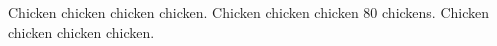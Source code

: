 Chicken chicken chicken chicken. Chicken chicken chicken 80 chickens. Chicken chicken chicken chicken.
